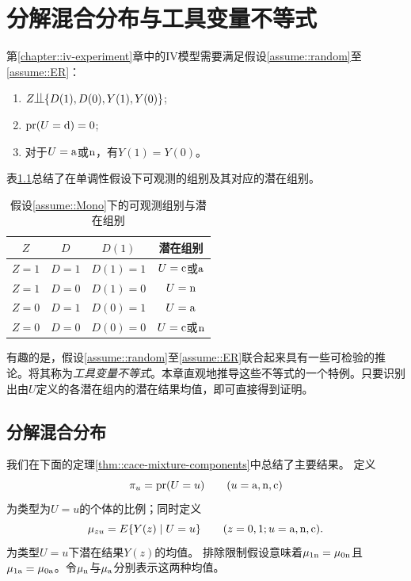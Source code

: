  
\chapter{分解混合分布与工具变量不等式}
 \label{chapter::iv-inequalities}

 
 第\ref{chapter::iv-experiment}章中的IV模型需要满足假设\ref{assume::random}至\ref{assume::ER}：
 \begin{enumerate}
 \item
 $Z\ind \{D(1), D(0) ,Y(1), Y(0)   \}$;
 \item
 $\textup{pr}(U = \textup{d}) = 0$;
 \item 
 对于$U=\textup{a}$或$\textup{n}$，有$Y(1) = Y(0)$。 
 \end{enumerate}


表\ref{table::obs-latent}总结了在单调性假设下可观测的组别及其对应的潜在组别。 


\begin{table}[h]
\centering
\caption{假设\ref{assume::Mono}下的可观测组别与潜在组别}\label{table::obs-latent}
\begin{tabular}{cccc}
\hline 
$Z$ & $D$ & $D(1)$ & 潜在组别 \\
\hline 
$Z=1$ & $D=1$ & $D(1) = 1$ & $U = \textup{c}$或$\textup{a}$ \\
$Z=1$ & $D=0$ & $D(1) = 0$ & $U = \textup{n}$ \\ 
$Z=0$ & $D=1$ & $D(0) = 1$ & $U = \textup{a}$  \\ 
$Z=0$ & $D=0$ & $D(0) = 0$ & $U = \textup{c}$或$\textup{n}$ \\
\hline 
\end{tabular}
\end{table}


有趣的是，假设\ref{assume::random}至\ref{assume::ER}联合起来具有一些可检验的推论。\citet{balke1997bounds}将其称为{\it 工具变量不等式}。本章直观地推导这些不等式的一个特例。只要识别出由$U$定义的各潜在组内的潜在结果均值，即可直接得到证明。 

\section{分解混合分布}
\label{sec::disentangle-mixtures}


我们在下面的定理\ref{thm::cace-mixture-components}中总结了主要结果。
定义
$$
\pi_u = \textup{pr}(U = u) \quad  \quad  (u=\textup{a}, \textup{n}, \textup{c}) 
$$ 
为类型为$U=u$的个体的比例；同时定义
$$
\mu_{zu} = E\{  Y(z) \mid U = u\}\quad  \quad (z=0,1;u=\textup{a}, \textup{n}, \textup{c}) .
$$ 
为类型$U=u$下潜在结果$Y(z) $的均值。
排除限制假设意味着$\mu_{1\textup{n}} = \mu_{0\textup{n}} $且$\mu_{1\textup{a}} = \mu_{0\textup{a}} $。令$\mu_{\textup{n}}$与$\mu_{\textup{a}} $分别表示这两种均值。

